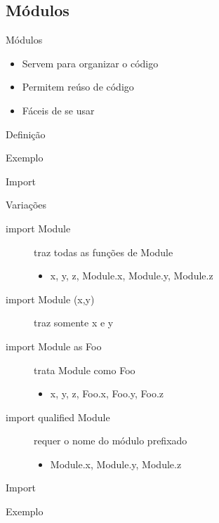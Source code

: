 \documentclass{beamer}
\begin{document}
		\subsection{Módulos}
			\begin{frame}[fragile]{Módulos}
			 \begin{itemize}
			  \item Servem para organizar o código
			  \item Permitem reúso de código
			  \item Fáceis de se usar
			 \end{itemize}
			\end{frame}
			
			\begin{frame}[fragile]{Definição}
			 \begin{block}{Exemplo}
			  
			 \end{block}
			\end{frame}
			
			\begin{frame}[fragile]{Import}
			 \begin{block}{Variações}
			  \begin{description}
			   \item [import Module] traz todas as funções de Module
					\begin{itemize}
					 \item x, y, z, Module.x, Module.y, Module.z
					\end{itemize}
				 \item [import Module (x,y)] traz somente x e y
				 \item [import Module as Foo] trata Module como Foo
					\begin{itemize}
					 \item x, y, z, Foo.x, Foo.y, Foo.z
					\end{itemize}

			   \item [import qualified Module] requer o nome do módulo prefixado
					\begin{itemize}
					 \item Module.x, Module.y, Module.z
					\end{itemize}
			  \end{description}			  
			 \end{block}
			\end{frame}
			
			\begin{frame}[fragile]{Import}
			 \begin{block}{Exemplo}
			  
			 \end{block}
			\end{frame}
			
\end{document}
